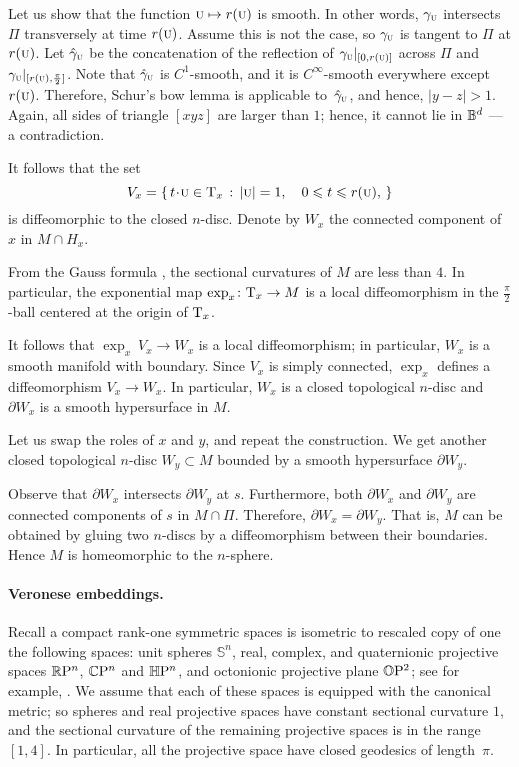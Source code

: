 \documentclass[a4paper,10pt]{article}
\begin{document}
Let us show that the function ${{\normalfont\textsc{u}}}\mapsto r({{\normalfont\textsc{u}}})$ is smooth.
In other words, $\gamma_{{\normalfont\textsc{u}}}$ intersects $\Pi$ transversely at time $r({{\normalfont\textsc{u}}})$.
Assume this is not the case, so $\gamma_{{\normalfont\textsc{u}}}$ is tangent to $\Pi$ at $r({{\normalfont\textsc{u}}})$.
Let $\hat\gamma_{{\normalfont\textsc{u}}}$ be the concatenation of the reflection of $\gamma_{{\normalfont\textsc{u}}}|_{[0,r({{\normalfont\textsc{u}}})]}$ across $\Pi$ and $\gamma_{{\normalfont\textsc{u}}}|_{[r({{\normalfont\textsc{u}}}),\frac\pi2]}$.
Note that $\hat \gamma_{{\normalfont\textsc{u}}}$ is $C^1$-smooth, and it is $C^\infty$-smooth everywhere except $r({{\normalfont\textsc{u}}})$.
Therefore, Schur's bow lemma is applicable to~$\hat \gamma_{{\normalfont\textsc{u}}}$, and hence, $|y-z|>1$.
Again, all sides of triangle $[xyz]$ are larger than $1$;
hence, it cannot lie in $\mathbb{B}^d$ --- a contradiction.  

It follows that the set 
\[V_x=\set{t\cdot {\mathsc{u}}\in \T_x}{|{\mathsc{u}}|=1,\quad 0\le t\le r({\mathsc{u}}),}\]
is diffeomorphic to the closed $n$-disc.
Denote by $W_x$ the connected component of $x$ in $M\cap H_x$.

From the Gauss formula \cite[Lemma 5]{petrunin2024}, the sectional curvatures of $M$ are less than $4$.
In particular, the exponential map $\exp_x\colon\mathrm{T}_x\to M$ is a local diffeomorphism in the $\tfrac\pi2$-ball centered at the origin of $\mathrm{T}_x$.

It follows that $\exp_x\:V_x\to W_x$ is a local diffeomorphism;
in particular, $W_x$ is a smooth manifold with boundary.
Since $V_x$ is simply connected, $\exp_x$ defines a diffeomorphism $V_x\to W_x$.
In particular, $W_x$ is a closed topological $n$-disc and $\partial W_x$ is a smooth hypersurface in $M$.

Let us swap the roles of $x$ and $y$, and repeat the construction.
We get another closed topological $n$-disc $W_y\subset M$ bounded by a smooth hypersurface $\partial W_y$.

Observe that $\partial W_x$ intersects $\partial W_y$ at $s$.
Furthermore, both $\partial W_x$ and $\partial W_y$ are connected components of $s$ in $M\cap \Pi$.
Therefore, $\partial W_x=\partial W_y$.
That is, $M$ can be obtained by gluing two $n$-discs by a diffeomorphism between their boundaries.
Hence $M$ is homeomorphic to the $n$-sphere.
\qeds

\paragraph{Veronese embeddings.}\label{veronese}
Recall a compact rank-one symmetric spaces is isometric to rescaled copy of one the following spaces:
unit spheres $\mathbb{S}^n$,
real, complex, and quaternionic projective spaces $\mathbb{R}\mathrm{P}^n$, $\mathbb{C}\mathrm{P}^n$ and $\mathbb{H}\mathrm{P}^n$,
and octonionic projective plane $\mathbb{O}\mathrm{P}^2$; see for example, \cite[8.12.2]{wolf}.
We assume that each of these spaces is equipped with the canonical metric;
so spheres and real projective spaces have constant sectional curvature $1$,
and the sectional curvature of the remaining projective spaces is in the range $[1,4]$.
In particular, all the projective space have closed geodesics of length~$\pi$.
\end{document}
